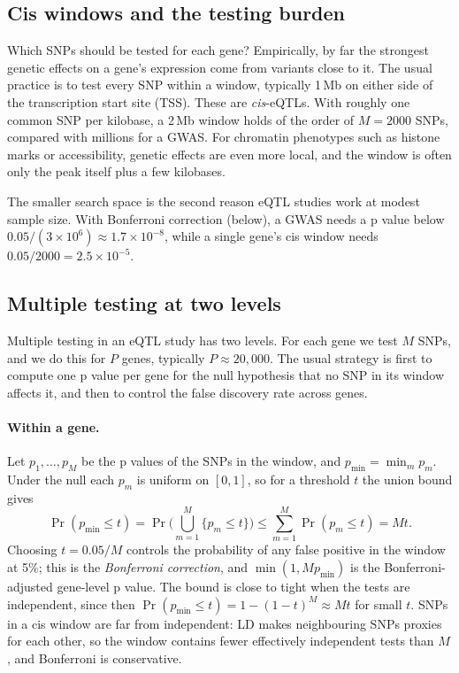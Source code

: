 \subsection{Cis windows and the testing burden}

Which SNPs should be tested for each gene? Empirically, by far the strongest genetic effects on a gene's expression come from variants close to it. The usual practice is to test every SNP within a window, typically 1\,Mb on either side of the transcription start site (TSS). These are \emph{cis}-eQTLs. With roughly one common SNP per kilobase, a 2\,Mb window holds of the order of $M=2000$ SNPs, compared with millions for a GWAS. For chromatin phenotypes such as histone marks or accessibility, genetic effects are even more local, and the window is often only the peak itself plus a few kilobases.

The smaller search space is the second reason eQTL studies work at modest sample size. With Bonferroni correction (below), a GWAS needs a p value below $0.05/(3\times10^6)\approx 1.7\times10^{-8}$, while a single gene's cis window needs $0.05/2000=2.5\times10^{-5}$.

\subsection{Multiple testing at two levels}

Multiple testing in an eQTL study has two levels. For each gene we test $M$ SNPs, and we do this for $P$ genes, typically $P\approx 20{,}000$. The usual strategy is first to compute one p value per gene for the null hypothesis that no SNP in its window affects it, and then to control the false discovery rate across genes.

\paragraph{Within a gene.} Let $p_1,\dots,p_M$ be the p values of the SNPs in the window, and $p_{\min}=\min_m p_m$. Under the null each $p_m$ is uniform on $[0,1]$, so for a threshold $t$ the union bound gives
\begin{equation}
  \Pr(p_{\min}\leq t) = \Pr\Big(\bigcup_{m=1}^M\{p_m\leq t\}\Big) \leq \sum_{m=1}^M\Pr(p_m\leq t) = Mt.
\end{equation}
Choosing $t=0.05/M$ controls the probability of any false positive in the window at 5\%; this is the \emph{Bonferroni correction}, and $\min(1,Mp_{\min})$ is the Bonferroni-adjusted gene-level p value. The bound is close to tight when the tests are independent, since then $\Pr(p_{\min}\leq t)=1-(1-t)^M\approx Mt$ for small $t$. SNPs in a cis window are far from independent: LD makes neighbouring SNPs proxies for each other, so the window contains fewer effectively independent tests than $M$, and Bonferroni is conservative.

